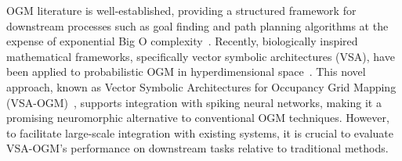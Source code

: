OGM literature is well-established, providing a structured framework for downstream processes such as goal finding and path planning algorithms at the expense of exponential Big O complexity~\cite{wilson2022convolutional}. Recently, biologically inspired mathematical frameworks, specifically vector symbolic architectures (VSA), have been applied to probabilistic OGM in hyperdimensional space~\cite{snyder2024brain}. This novel approach, known as Vector Symbolic Architectures for Occupancy Grid Mapping (VSA-OGM)~\cite{snyder2024brain}, supports integration with spiking neural networks, making it a promising neuromorphic alternative to conventional OGM techniques.
However, to facilitate large-scale integration with existing systems, it is crucial to evaluate VSA-OGM's performance on downstream tasks relative to traditional methods.

